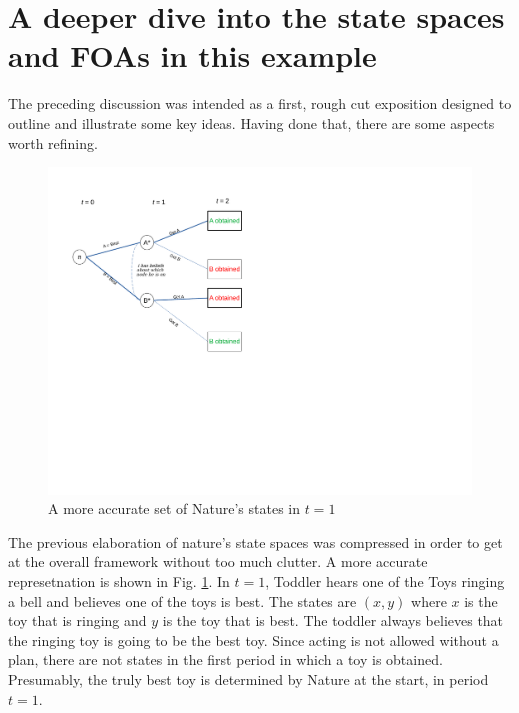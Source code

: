 \documentclass[
11pt,
titlepage,
reqno,
]{article}%
\theoremstyle{definition}
\begin{document}
\section{A deeper dive into the state spaces and FOAs in this example}
The preceding discussion was intended as a first, rough cut exposition designed to outline and illustrate some key ideas. Having done that, there are some aspects worth refining.  

\begin{figure}[h!]
	\centering
	\includegraphics*[page=15,trim = 0in 7in 6in 0in,scale=1]{Awareness_Diagrams_All}
	\caption{A more accurate set of Nature's states in $t=1$\label{Diag: p-15}}%
\end{figure}

The previous elaboration of nature's state spaces was compressed in order to get at the overall framework without too much clutter. A more accurate represetnation is shown in Fig. \ref{Diag: p-15}. In $t=1$, Toddler hears one of the Toys ringing a bell and believes one of the toys is best. The states are $(x,y)$ where $x$ is the toy that is ringing and $y$ is the toy that is best. The toddler always believes that the ringing toy is going to be the best toy. Since acting is not allowed without a plan, there are not states in the first period in which a toy is obtained. Presumably, the truly best toy is determined by Nature at the start, in period $t=1$.
\end{document}
